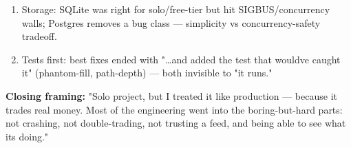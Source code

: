 \documentclass[11pt]{article}
\providecommand{\tightlist}{\setlength{\itemsep}{1pt}\setlength{\parskip}{0pt}}
\begin{document}
\begin{enumerate}
\def\labelenumi{\arabic{enumi}.}
\tightlist
\item
  Storage: SQLite was right for solo/free-tier but hit SIGBUS/concurrency walls; Postgres removes a bug class --- simplicity vs concurrency-safety tradeoff.
\item
  Tests first: best fixes ended with "\ldots and added the test that would\textquotesingle ve caught it" (phantom-fill, path-depth) --- both invisible to "it runs."
\end{enumerate}

\textbf{Closing framing:} "Solo project, but I treated it like production --- because it trades
real money. Most of the engineering went into the boring-but-hard parts: not crashing,
not double-trading, not trusting a feed, and being able to see what it\textquotesingle s doing."
\end{document}

